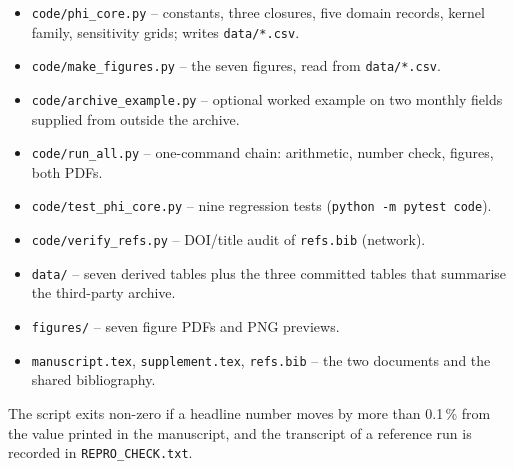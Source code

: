 \documentclass[preprint,12pt,authoryear]{elsarticle}
\begin{document}
\begin{itemize}
\footnotesize
\item \texttt{code/phi\_core.py} -- constants, three closures, five domain records, kernel family, sensitivity grids; writes \texttt{data/*.csv}.
\item \texttt{code/make\_figures.py} -- the seven figures, read from \texttt{data/*.csv}.
\item \texttt{code/archive\_example.py} -- optional worked example on two monthly fields supplied from outside the archive.
\item \texttt{code/run\_all.py} -- one-command chain: arithmetic, number check, figures, both PDFs.
\item \texttt{code/test\_phi\_core.py} -- nine regression tests (\texttt{python -m pytest code}).
\item \texttt{code/verify\_refs.py} -- DOI/title audit of \texttt{refs.bib} (network).
\item \texttt{data/} -- seven derived tables plus the three committed tables that summarise the third-party archive.
\item \texttt{figures/} -- seven figure PDFs and PNG previews.
\item \texttt{manuscript.tex}, \texttt{supplement.tex}, \texttt{refs.bib} -- the two documents and the shared bibliography.
\end{itemize}

The script exits non-zero if a headline number moves by more than 0.1\,\% from the value printed in the manuscript, and the transcript of a reference run is recorded in \texttt{REPRO\_CHECK.txt}.



\end{document}
